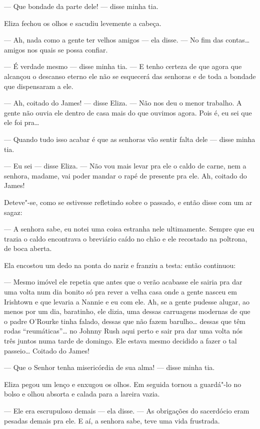 --- Que bondade da parte dele! --- disse minha tia.

Eliza fechou os olhos e sacudiu levemente a cabeça.

--- Ah, nada como a gente ter velhos amigos --- ela disse.  --- No fim das
contas\ldots{} amigos nos quais se possa confiar.

--- É verdade mesmo --- disse minha tia.  --- E tenho certeza de que agora
que alcançou o descanso eterno ele não se esquecerá das senhoras e de toda a
bondade que dispensaram a ele.

--- Ah, coitado do James! --- disse Eliza.  --- Não nos deu o menor trabalho.
A gente não ouvia ele dentro de casa mais do que ouvimos agora.  Pois é, eu sei
que ele foi pra\ldots{}

--- Quando tudo isso acabar é que as senhoras vão sentir falta dele ---
disse minha tia.

--- Eu sei --- disse Eliza.  --- Não vou mais levar pra ele o caldo de carne,
nem a senhora, madame, vai poder mandar o rapé de presente pra ele.  Ah,
coitado do James!

Deteve"-se, como se estivesse refletindo sobre o passado, e então disse com um
ar sagaz:

--- A senhora sabe, eu notei uma coisa estranha nele ultimamente.  Sempre
que eu trazia o caldo encontrava o breviário caído no chão e ele recostado na
poltrona, de boca aberta.

Ela encostou um dedo na ponta do nariz e franziu a testa: então continuou:

--- Mesmo imóvel ele repetia que antes que o verão acabasse ele sairia pra dar
uma volta num dia bonito só pra rever a velha casa onde a gente nasceu em
Irishtown e que levaria a Nannie e eu com ele.  Ah, se a gente pudesse alugar,
ao menos por um dia, baratinho, ele dizia, uma dessas carruagens modernas de
que o padre O’Rourke tinha falado, dessas que não fazem barulho\ldots{} dessas
que têm rodas ``reumáticas''\ldots{} no Johnny Rush aqui perto e sair pra dar uma
volta nós três juntos numa tarde de domingo.  Ele estava mesmo decidido a fazer
o tal passeio\ldots{} Coitado do James!

--- Que o Senhor tenha misericórdia de sua alma! --- disse minha tia.

Eliza pegou um lenço e enxugou os olhos.  Em seguida tornou a guardá"-lo no
bolso e olhou absorta e calada para a lareira vazia.

--- Ele era escrupuloso demais --- ela disse.  --- As obrigações do sacerdócio
eram pesadas demais pra ele.  E aí, a senhora sabe, teve uma vida frustrada.

